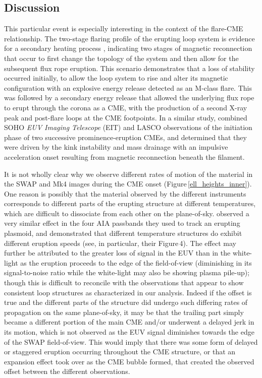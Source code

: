 \documentclass[namedreferences]{solarphysics}
\begin{document}
\begin{article}
\section{Discussion}
\label{sect:discussion}

This particular event is especially interesting in the context of the flare-CME relationship. The two-stage flaring profile of the erupting loop system is evidence for a secondary heating process \cite{2012ApJ...746L...5S}, indicating two stages of magnetic reconnection that occur to first change the topology of the system and then allow for the subsequent flux rope eruption. This scenario demonstrates that a loss of stability occurred initially, to allow the loop system to rise and alter its magnetic configuration with an explosive energy release detected as an M-class flare. This was followed by a secondary energy release that allowed the underlying flux rope to erupt through the corona as a CME, with the production of a second X-ray peak and post-flare loops at the CME footpoints. In a similar study,  combined SOHO \emph{EUV Imaging Telescope} (EIT) and LASCO observations of the initiation phase of two successive prominence-eruption CMEs, and determined that they were driven by the kink instability and mass drainage with an impulsive acceleration onset resulting from magnetic reconnection beneath the filament.

It is not wholly clear why we observe different rates of motion of the material in the SWAP and Mk4 images during the CME onset (Figure\,\ref{ell_heights_inner}). One reason is possibly that the material observed by the different instruments corresponds to different parts of the erupting structure at different temperatures, which are difficult to dissociate from each other on the plane-of-sky.  observed a very similar effect in the four AIA passbands they used to track an erupting plasmoid, and demonstrated that different temperature structures do exhibit different eruption speeds (see, in particular, their Figure\,4). The effect may further be attributed to the greater loss of signal in the EUV than in the white-light as the eruption proceeds to the edge of the field-of-view (diminishing in its signal-to-noise ratio while the white-light may also be showing plasma pile-up); though this is difficult to reconcile with the observations that appear to show consistent loop structures as characterized in our analysis. Indeed if the offset is true and the different parts of the structure did undergo such differing rates of propagation on the same plane-of-sky, it may be that the trailing part simply became a different portion of the main CME and/or underwent a delayed jerk in its motion, which is not observed as the EUV signal diminishes towards the edge of the SWAP field-of-view. This would imply that there was some form of delayed or staggered eruption occurring throughout the CME structure, or that an expansion effect took over as the CME bubble formed, that created the observed offset between the different observations. 


\end{article}
\end{document}
